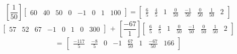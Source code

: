 \documentclass[landscape]{article}
\begin{document}
{\Huge
\[
\left[\frac{1}{50}
\right]\left[\begin{array}{cccccccc}
60
&40
&50
&0
&-1
&0
&1
&100
\end{array}
\right]
=\left[
\begin{array}{cccccccc}
\frac{6}{5}
&\frac{4}{5}
&1
&\frac{0}{50}
&\frac{-1}{50}
&\frac{0}{50}
&\frac{1}{50}
&2
\end{array}
\right]
\]
\[
\left[\begin{array}{cccccccc}
57
&52
&67
&-1
&0
&1
&0
&300
\end{array}
\right]\,+\,
\left[\frac{-67}{1}
\right]\left[\begin{array}{cccccccc}
\frac{6}{5}
&\frac{4}{5}
&1
&\frac{0}{50}
&\frac{-1}{50}
&\frac{0}{50}
&\frac{1}{50}
&2
\end{array}
\right]\]
\[
=\,\left[\begin{array}{cccccccc}
\frac{-117}{5}
&\frac{-8}{5}
&0
&-1
&\frac{67}{50}
&1
&\frac{-67}{50}
&166
\end{array}
\right]
\]
}
\end{document}
